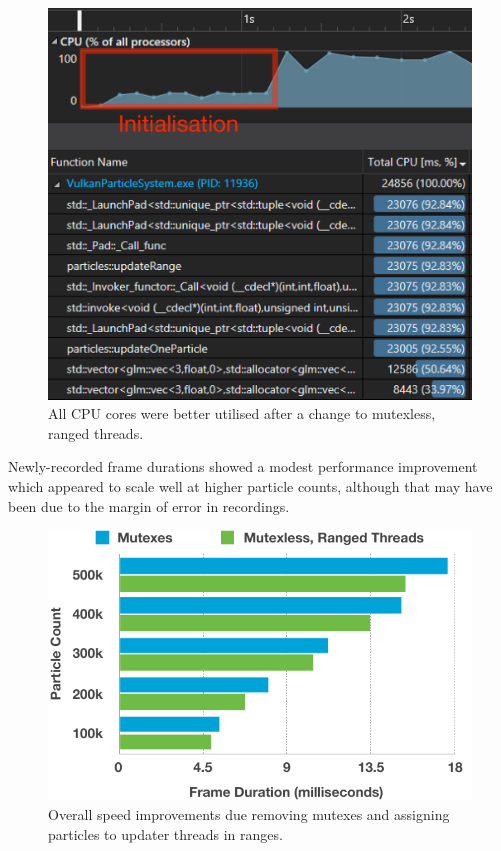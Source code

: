\documentclass[11pt, a4paper, twocolumn]{article}
\begin{document}
\begin{figure}[h]
\includegraphics[width=\linewidth]{mutexless-diag}
\caption{All CPU cores were better utilised after a change to mutexless, ranged threads.}
\label{fig:mutexless-diag}
\end{figure}

Newly-recorded frame durations showed a modest performance improvement which appeared to scale well at higher particle counts, although that may have been due to the margin of error in recordings.

\begin{figure}[h]
\includegraphics[width=\linewidth]{mutexes-rangedthreads}
\caption{Overall speed improvements due removing mutexes and assigning particles to updater threads in ranges.}
\label{fig:mutexes-rangedthreads}
\end{figure}
\end{document}
